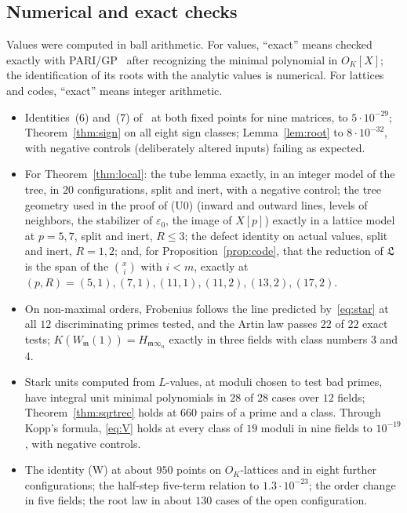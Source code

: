 \documentclass[11pt]{amsart}
\numberwithin{equation}{section}
\theoremstyle{plain}
\theoremstyle{definition}
\theoremstyle{remark}
\begin{document}
\subsection*{Numerical and exact checks}
Values were computed in ball arithmetic. For values, ``exact'' means checked exactly with PARI/GP~\cite{PARI} after recognizing the minimal polynomial in $O_K[X]$; the identification of its roots with the analytic values is numerical. For lattices and codes, ``exact'' means integer arithmetic.
\begin{itemize}
\item Identities~(6) and~(7) of~\cite{RW} at both fixed points for nine matrices, to $5\cdot10^{-29}$; Theorem~\ref{thm:sign} on all eight sign classes; Lemma~\ref{lem:root} to $8\cdot10^{-32}$, with negative controls (deliberately altered inputs) failing as expected.
\item For Theorem~\ref{thm:local}: the tube lemma exactly, in an integer model of the tree, in $20$ configurations, split and inert, with a negative control; the tree geometry used in the proof of (U0) (inward and outward lines, levels of neighbors, the stabilizer of $\varepsilon_0$, the image of $X[p]$) exactly in a lattice model at $p=5,7$, split and inert, $R\le3$; the defect identity on actual values, split and inert, $R=1,2$; and, for Proposition~\ref{prop:code}, that the reduction of $\mathfrak L$ is the span of the $\binom xi$ with $i<m$, exactly at $(p,R)=(5,1),(7,1),(11,1),(11,2),(13,2),(17,2)$.
\item On non-maximal orders, Frobenius follows the line predicted by~\eqref{eq:star} at all $12$ discriminating primes tested, and the Artin law passes $22$ of $22$ exact tests; $K(W_{\mathfrak m}(1))=H_{\mathfrak m\infty_u}$ exactly in three fields with class numbers $3$ and $4$.
\item Stark units computed from $L$-values, at moduli chosen to test bad primes, have integral unit minimal polynomials in $28$ of $28$ cases over $12$ fields; Theorem~\ref{thm:sqrtrec} holds at $660$ pairs of a prime and a class. Through Kopp's formula, \eqref{eq:V} holds at every class of $19$ moduli in nine fields to $10^{-19}$, with negative controls.
\item The identity (W) at about $950$ points on $O_K$-lattices and in eight further configurations; the half-step five-term relation to $1.3\cdot10^{-23}$; the order change in five fields; the root law in about $130$ cases of the open configuration.
\end{itemize}
\end{document}
